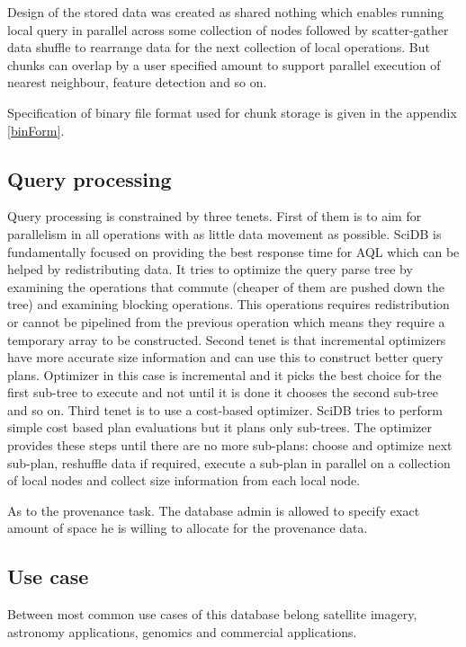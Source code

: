 Design of the stored data was created as shared nothing which enables running local query in parallel across some collection of nodes followed by scatter-gather data shuffle to rearrange data for the next collection of local operations. But chunks can overlap by a user specified amount to support parallel execution of nearest neighbour, feature detection and so on.

Specification of binary file format used for chunk storage is given in the appendix \ref{binForm}.

\subsection{Query processing}

Query processing is constrained by three tenets.
First of them is to aim for parallelism in all operations with as little data movement as possible. SciDB is fundamentally focused on providing the best response time for AQL which can be helped by redistributing data. It tries to optimize the query parse tree by examining the operations that commute (cheaper of them are pushed down the tree) and examining blocking operations. This operations requires redistribution or cannot be pipelined from the previous operation which means they require a temporary array to be constructed.
Second tenet is that incremental optimizers have more accurate size information and can use this to construct better query plans. Optimizer in this case is incremental and it picks the best choice for the first sub-tree to execute and not until it is done it chooses the second sub-tree and so on.
Third tenet is to use a cost-based optimizer. SciDB tries to perform simple cost based plan evaluations but it plans only sub-trees. The optimizer provides these steps until there are no more sub-plans: choose and optimize next sub-plan, reshuffle data if required, execute a sub-plan in parallel on a collection of local nodes and collect size information from each local node.

As to the provenance task. The database admin is allowed to specify exact amount of space he is willing to allocate for the provenance data. \cite{scidbarch}

\subsection{Use case}

Between most common use cases of this database belong satellite imagery, astronomy applications, genomics and commercial applications.

